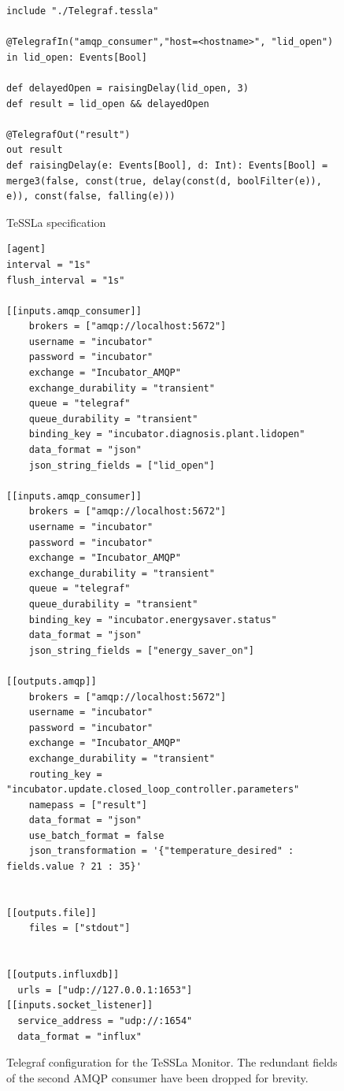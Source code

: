 	\begin{figure}[H]
		\centering
		\begin{lstlisting}[style=code]
include "./Telegraf.tessla"

@TelegrafIn("amqp_consumer","host=<hostname>", "lid_open")
in lid_open: Events[Bool]

def delayedOpen = raisingDelay(lid_open, 3)
def result = lid_open && delayedOpen

@TelegrafOut("result")
out result
def raisingDelay(e: Events[Bool], d: Int): Events[Bool] = merge3(false, const(true, delay(const(d, boolFilter(e)), e)), const(false, falling(e)))
	\end{lstlisting}
		\caption{TeSSLa specification}
		\label{fig:tessla_spec_active}
	\end{figure}



	\begin{figure}[ht]
		\centering
		\begin{lstlisting}[style=code]
[agent]
interval = "1s"
flush_interval = "1s"

[[inputs.amqp_consumer]]
	brokers = ["amqp://localhost:5672"]
	username = "incubator"
	password = "incubator"
	exchange = "Incubator_AMQP"
	exchange_durability = "transient"
	queue = "telegraf"
	queue_durability = "transient"
	binding_key = "incubator.diagnosis.plant.lidopen"
	data_format = "json"
	json_string_fields = ["lid_open"]

[[inputs.amqp_consumer]]
	brokers = ["amqp://localhost:5672"]
	username = "incubator"
	password = "incubator"
	exchange = "Incubator_AMQP"
	exchange_durability = "transient"
	queue = "telegraf"
	queue_durability = "transient"
	binding_key = "incubator.energysaver.status"
	data_format = "json"
	json_string_fields = ["energy_saver_on"]

[[outputs.amqp]]
	brokers = ["amqp://localhost:5672"]
	username = "incubator"
	password = "incubator"
	exchange = "Incubator_AMQP"
	exchange_durability = "transient"
	routing_key = "incubator.update.closed_loop_controller.parameters"
	namepass = ["result"]
	data_format = "json"
	use_batch_format = false
    json_transformation = '{"temperature_desired" : fields.value ? 21 : 35}'


[[outputs.file]]
	files = ["stdout"]


[[outputs.influxdb]]
  urls = ["udp://127.0.0.1:1653"]
[[inputs.socket_listener]]
  service_address = "udp://:1654"
  data_format = "influx"
	\end{lstlisting}
		\caption{Telegraf configuration for the TeSSLa Monitor. The redundant fields of the second AMQP consumer have been dropped for brevity.}
		\label{fig:telegraf_conf}
	\end{figure}

\fi


